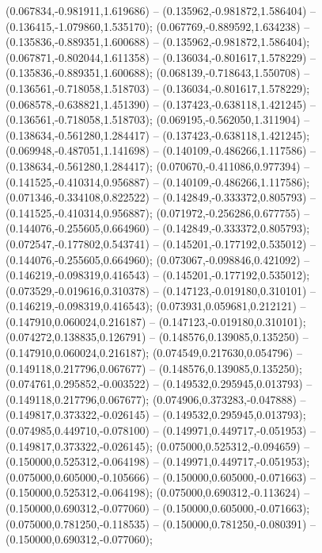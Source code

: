  (0.067834,-0.981911,1.619686) -- (0.135962,-0.981872,1.586404) -- (0.136415,-1.079860,1.535170);
 (0.067769,-0.889592,1.634238) -- (0.135836,-0.889351,1.600688) -- (0.135962,-0.981872,1.586404);
 (0.067871,-0.802044,1.611358) -- (0.136034,-0.801617,1.578229) -- (0.135836,-0.889351,1.600688);
 (0.068139,-0.718643,1.550708) -- (0.136561,-0.718058,1.518703) -- (0.136034,-0.801617,1.578229);
 (0.068578,-0.638821,1.451390) -- (0.137423,-0.638118,1.421245) -- (0.136561,-0.718058,1.518703);
 (0.069195,-0.562050,1.311904) -- (0.138634,-0.561280,1.284417) -- (0.137423,-0.638118,1.421245);
 (0.069948,-0.487051,1.141698) -- (0.140109,-0.486266,1.117586) -- (0.138634,-0.561280,1.284417);
 (0.070670,-0.411086,0.977394) -- (0.141525,-0.410314,0.956887) -- (0.140109,-0.486266,1.117586);
 (0.071346,-0.334108,0.822522) -- (0.142849,-0.333372,0.805793) -- (0.141525,-0.410314,0.956887);
 (0.071972,-0.256286,0.677755) -- (0.144076,-0.255605,0.664960) -- (0.142849,-0.333372,0.805793);
 (0.072547,-0.177802,0.543741) -- (0.145201,-0.177192,0.535012) -- (0.144076,-0.255605,0.664960);
 (0.073067,-0.098846,0.421092) -- (0.146219,-0.098319,0.416543) -- (0.145201,-0.177192,0.535012);
 (0.073529,-0.019616,0.310378) -- (0.147123,-0.019180,0.310101) -- (0.146219,-0.098319,0.416543);
 (0.073931,0.059681,0.212121) -- (0.147910,0.060024,0.216187) -- (0.147123,-0.019180,0.310101);
 (0.074272,0.138835,0.126791) -- (0.148576,0.139085,0.135250) -- (0.147910,0.060024,0.216187);
 (0.074549,0.217630,0.054796) -- (0.149118,0.217796,0.067677) -- (0.148576,0.139085,0.135250);
 (0.074761,0.295852,-0.003522) -- (0.149532,0.295945,0.013793) -- (0.149118,0.217796,0.067677);
 (0.074906,0.373283,-0.047888) -- (0.149817,0.373322,-0.026145) -- (0.149532,0.295945,0.013793);
 (0.074985,0.449710,-0.078100) -- (0.149971,0.449717,-0.051953) -- (0.149817,0.373322,-0.026145);
 (0.075000,0.525312,-0.094659) -- (0.150000,0.525312,-0.064198) -- (0.149971,0.449717,-0.051953);
 (0.075000,0.605000,-0.105666) -- (0.150000,0.605000,-0.071663) -- (0.150000,0.525312,-0.064198);
 (0.075000,0.690312,-0.113624) -- (0.150000,0.690312,-0.077060) -- (0.150000,0.605000,-0.071663);
 (0.075000,0.781250,-0.118535) -- (0.150000,0.781250,-0.080391) -- (0.150000,0.690312,-0.077060);
